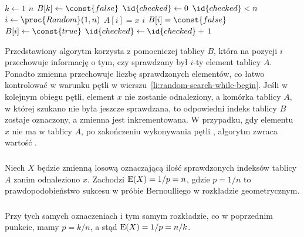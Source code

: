 \subsubsection{} %
\begin{codebox}
\li	\For $k\gets1$ \To $n$
\li	 \Do
			$B[k]\gets\const{false}$
		\End
\li	$\id{checked}\gets0$
\li	\While $\id{checked}<n$ \label{li:random-search-while-begin}
\li		\Do
			$i\gets\proc{Random}(1,n)$
\li			\If $A[i]=x$
\li				\Then
					\Return $i$
\li				\ElseIf $B[i]=\const{false}$
\li					\Then
						$B[i]\gets\const{true}$
\li						$\id{checked}\gets\id{checked}+\,1$
					\End
				\End
		\End
\li	\Return {}
\end{codebox}
Przedstawiony algorytm korzysta z pomocniczej tablicy $B$, która na pozycji $i$ przechowuje informację o tym, czy sprawdzany był $i$-ty element tablicy $A$. Ponadto zmienna  przechowuje liczbę sprawdzonych elementów, co łatwo kontrolować w warunku pętli  w wierszu~\ref{li:random-search-while-begin}. Jeśli w kolejnym obiegu pętli, element $x$ nie zostanie odnaleziony, a komórka tablicy $A$, w której szukano nie była jeszcze sprawdzana, to odpowiedni indeks tablicy $B$ zostaje oznaczony, a zmienna  jest inkrementowana. W przypadku, gdy elementu $x$ nie ma w tablicy $A$, po zakończeniu wykonywania pętli , algorytm zwraca wartość .

\subsubsection{} %
Niech $X$ będzie zmienną losową oznaczającą ilość sprawdzonych indeksów tablicy $A$ zanim odnaleziono $x$. Zachodzi $\operatorname{E}(X)=1/p=n$, gdzie $p=1/n$ to prawdopodobieństwo sukcesu w próbie Bernoulliego w rozkładzie geometrycznym.

\subsubsection{} %
Przy tych samych oznaczeniach i tym samym rozkładzie, co w poprzednim punkcie, mamy $p=k/n$, a stąd $\operatorname{E}(X)=1/p=n/k$.

